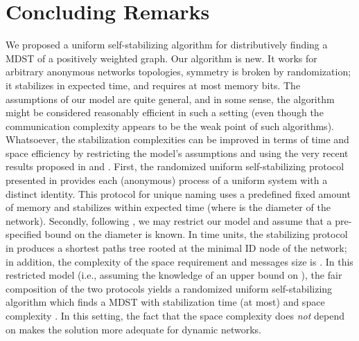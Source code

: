 \documentclass[10pt]{article}
\begin{document}
\section{Concluding Remarks}\label{concl}
We proposed a uniform self-stabilizing algorithm for distributively
finding a MDST of a positively weighted graph. Our algorithm is new.
It works for arbitrary anonymous networks topologies, symmetry is
broken by randomization; it stabilizes in  expected time, and requires at most  memory bits. The assumptions of our model  are quite
general, and in some sense, the algorithm might be considered
reasonably efficient in such a setting (even though the communication
complexity appears to be the weak point of such algorithms).
Whatsoever, the stabilization complexities can be improved in terms
of time and space efficiency by restricting the model's assumptions
and using the very recent results proposed in \cite{Dole94} and
\cite{AKMP+93}. First, the randomized uniform self-stabilizing
protocol presented in \cite{Dole94} provides each (anonymous) process
of a uniform system with a distinct identity. This protocol for unique
naming uses a predefined fixed amount of memory and stabilizes within
 expected time (where  is the diameter of the network).
Secondly, following \cite{AKMP+93}, we may restrict our model and assume
that a pre-specified bound  on the diameter  is known.
In  time units, the stabilizing protocol in \cite{AKMP+93} produces
a shortest paths tree rooted at the minimal ID node of the network;
in addition, the complexity of the space requirement and messages size
is . In this restricted model (i.e., assuming the knowledge
of an upper bound on ), the fair composition of the two protocols yields
a randomized uniform self-stabilizing algorithm which finds a MDST with
stabilization time (at most)  and space complexity . 
In this setting, the fact that the space complexity does {\em not}
depend on  makes the solution more adequate for dynamic networks.
\end{document}
